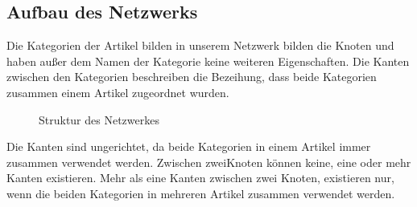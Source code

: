 \documentclass{acm_proc_article-sp}
\begin{document}
\subsection{Aufbau des Netzwerks}
Die Kategorien der Artikel bilden in unserem Netzwerk bilden die Knoten und haben außer dem Namen der Kategorie keine weiteren Eigenschaften. Die Kanten zwischen den Kategorien beschreiben die Bezeihung, dass beide Kategorien zusammen einem Artikel zugeordnet wurden. 
\begin{figure}[H]
\centering
{}
\caption{Struktur des Netzwerkes}
\end{figure}
Die Kanten sind ungerichtet, da beide Kategorien in einem Artikel immer zusammen verwendet werden. Zwischen zweiKnoten können keine, eine oder mehr Kanten existieren. Mehr als eine Kanten zwischen zwei Knoten, existieren nur, wenn die beiden Kategorien in mehreren Artikel zusammen verwendet werden.
\end{document}
